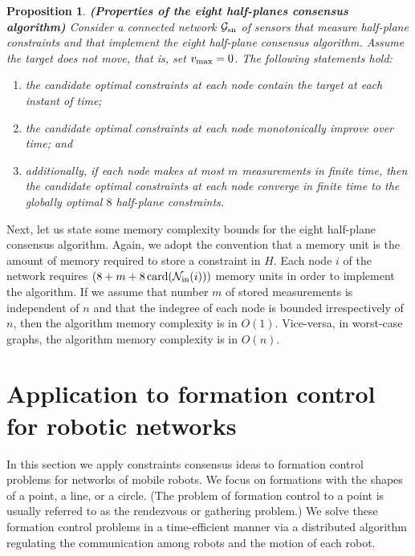 \documentclass[onecolumn,journal,letterpaper]{IEEEtran}
\newcommand{\subscr}[2]{{#1}_{\textup{#2}}}
\newcommand{\vmax}{\subscr{v}{max}}
\newcommand{\GG}{\mathcal{G}}
\newcommand{\card}{\ensuremath{\operatorname{card}}}
\newcommand{\innbrs}{\subscr{\mathcal{N}}{in}}
\newtheorem{proposition}[theorem]{Proposition}
\begin{document}
\begin{proposition}\textbf{\textup{(Properties of the eight half-planes consensus algorithm)}}
  Consider a connected network $\subscr{\GG}{sn}$ of sensors that measure
  half-plane constraints and that implement the eight half-plane consensus
  algorithm.  Assume the target does not move, that is, set $\vmax=0$. The
  following statements hold:
  \begin{enumerate}
  \item the candidate optimal constraints at each node contain the target
    at each instant of time;
  \item the candidate optimal constraints at each node monotonically
    improve over time; and
  \item additionally, if each node makes at most $m$ measurements in finite
    time, then the candidate optimal constraints at each node converge in
    finite time to the globally optimal $8$ half-plane constraints.
  \end{enumerate}
\end{proposition}

Next, let us state some memory complexity bounds for the eight half-plane
consensus algorithm. Again, we adopt the convention that a memory unit is
the amount of memory required to store a constraint in $H$.  Each node $i$
of the network requires $(8+m+8\card(\innbrs(i)))$ memory units in order to
implement the algorithm.
If we assume that number $m$ of stored measurements is independent of $n$
and that the indegree of each node is bounded irrespectively of $n$, then
the algorithm memory complexity is in $O(1)$. Vice-versa, in worst-case
graphs, the algorithm memory complexity is in $O(n)$.




\section{Application to formation control for robotic networks}
\label{sec:mintime-formation}

In this section we apply constraints consensus ideas to formation control
problems for networks of mobile robots.  We focus on formations with the
shapes of a point, a line, or a circle. (The problem of formation control
to a point is usually referred to as the rendezvous or gathering problem.)
We solve these formation control problems in a time-efficient manner via a
distributed algorithm regulating the communication among robots and the
motion of each robot.
\end{document}
